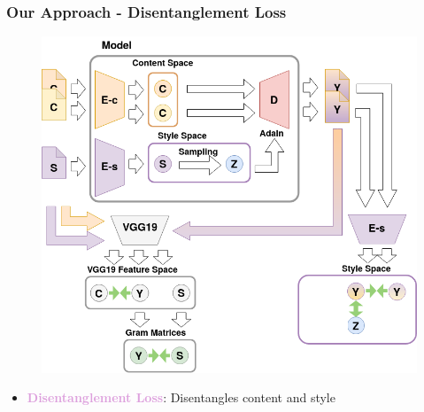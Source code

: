 \documentclass[11pt,xcolor=dvipsnames]{beamer}
\begin{document}
\begin{frame}
  \addtocounter{framenumber}{-1}
\frametitle{Our Approach - Disentanglement Loss}
\begin{figure}
\centering
\includegraphics[scale=0.3]{pipelinedisentangled.png}
\end{figure}


\begin{itemize}
	\item \textcolor{Plum}{\textbf{Disentanglement Loss}}: Disentangles content and style
	\vspace{10pt}
\end{itemize}

\end{frame}
\end{document}
